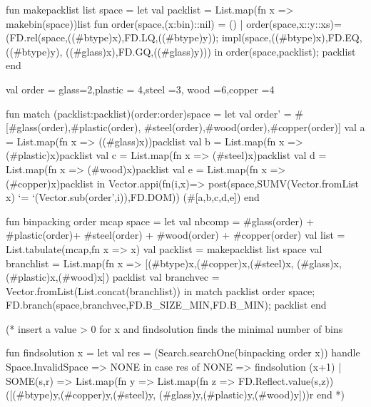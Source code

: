 \documentclass[a4paper,halfparskip]{scrartcl}
\begin{document}
\begin{myverbatim}
fun makepacklist list space = 
    let
        val packlist = List.map(fn x => makebin(space))list
        fun order(space,(x:bin)::nil) = ()
          | order(space,x::y::xs)=
                (FD.rel(space,((#btype)x),FD.LQ,((#btype)y));
                 impl(space,((#btype)x),FD.EQ,((#btype)y),
                            ((#glass)x),FD.GQ,((#glass)y))) 
    in
        order(space,packlist);
        packlist
    end                            

val order = {glass=2,plastic = 4,steel =3,
             wood =6,copper =4}

fun match (packlist:packlist)(order:order)space = 
    let
        val order' = #[#glass(order),#plastic(order),
             #steel(order),#wood(order),#copper(order)]
        val a = List.map(fn x => ((#glass)x))packlist
        val b = List.map(fn x => (#plastic)x)packlist
        val c = List.map(fn x => (#steel)x)packlist
        val d = List.map(fn x => (#wood)x)packlist
        val e = List.map(fn x => (#copper)x)packlist
    in 
        Vector.appi(fn(i,x)=> post(space,SUMV(Vector.fromList x)
                       `=  `(Vector.sub(order',i)),FD.DOM))
                   (#[a,b,c,d,e])
    end
          
              

fun binpacking order mcap space =
    let 
        val nbcomp = #glass(order) + #plastic(order)+ 
                     #steel(order) + #wood(order) + 
                     #copper(order)
        val list = List.tabulate(mcap,fn x => x)
        val packlist = makepacklist list space
        val branchlist = List.map(fn x =>
                          [(#btype)x,(#copper)x,(#steel)x,
                           (#glass)x,(#plastic)x,(#wood)x])
                         packlist
        val branchvec = Vector.fromList(List.concat(branchlist))
    in 
        match packlist order space;
        FD.branch(space,branchvec,FD.B_SIZE_MIN,FD.B_MIN);
        packlist
    end


(* insert a value > 0 for x and findsolution finds the 
   minimal number of bins 

 fun findsolution x =
   let 
      val res =  (Search.searchOne(binpacking order x))
                    handle Space.InvalidSpace => NONE
   in
      case res of NONE => findsolution (x+1)
                | SOME(s,r) => 
                     List.map(fn y =>
                         List.map(fn z => FD.Reflect.value(s,z))
                               ([(#btype)y,(#copper)y,(#steel)y,
                               (#glass)y,(#plastic)y,(#wood)y]))r
   end
*)
\end{myverbatim}
\end{document}
